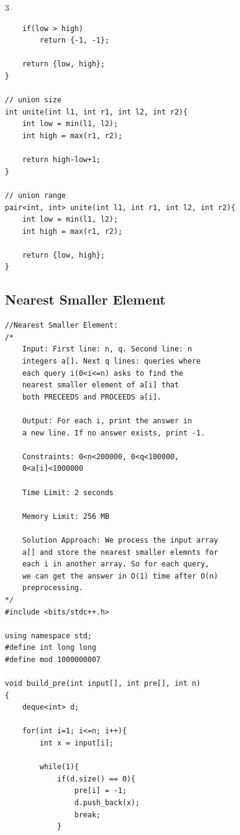\documentclass[twoside]{article}
\begin{document}
\begin{multicols*}{3}
\begin{verbatim}
    if(low > high) 
        return {-1, -1};

    return {low, high};
}

// union size
int unite(int l1, int r1, int l2, int r2){
    int low = min(l1, l2); 
    int high = max(r1, r2);

    return high-low+1;
}

// union range
pair<int, int> unite(int l1, int r1, int l2, int r2){
    int low = min(l1, l2); 
    int high = max(r1, r2);

    return {low, high};
}

\end{verbatim}

{
\subsection*{Nearest Smaller Element}
}
\begin{verbatim}
//Nearest Smaller Element:
/*
    Input: First line: n, q. Second line: n 
    integers a[]. Next q lines: queries where
    each query i(0<i<=n) asks to find the 
    nearest smaller element of a[i] that 
    both PRECEEDS and PROCEEDS a[i].

    Output: For each i, print the answer in
    a new line. If no answer exists, print -1.

    Constraints: 0<n<200000, 0<q<100000,
    0<a[i]<1000000

    Time Limit: 2 seconds

    Memory Limit: 256 MB

    Solution Approach: We process the input array
    a[] and store the nearest smaller elemnts for
    each i in another array. So for each query,
    we can get the answer in O(1) time after O(n)
    preprocessing.
*/
#include <bits/stdc++.h>

using namespace std;
#define int long long
#define mod 1000000007

void build_pre(int input[], int pre[], int n)
{
    deque<int> d;

    for(int i=1; i<=n; i++){
        int x = input[i];
        
        while(1){
            if(d.size() == 0){
                pre[i] = -1;
                d.push_back(x);
                break;
            }


\end{verbatim}
\end{multicols*}
\end{document}
